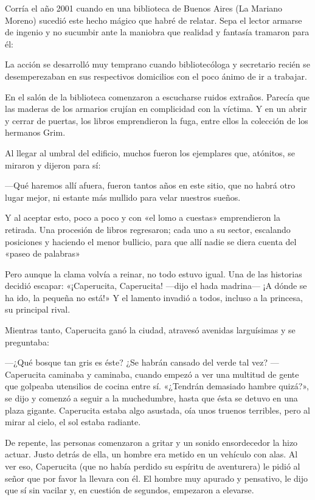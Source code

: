\documentclass[11pt,twoside,openright,a5paper]{book}
\begin{document}
Corría el año 2001 cuando en una biblioteca de Buenos Aires (La Mariano Moreno) sucedió este hecho mágico que habré de relatar. Sepa el lector armarse de ingenio y no sucumbir ante la maniobra que realidad y fantasía tramaron para él:

La acción se desarrolló muy temprano cuando bibliotecóloga y secretario recién se desemperezaban en sus respectivos domicilios con el poco ánimo de ir a trabajar.

En el salón de la biblioteca comenzaron a escucharse ruidos extraños. Parecía que las maderas de los armarios crujían  en complicidad con la víctima. Y en un abrir y cerrar de puertas, los libros emprendieron la fuga, entre ellos la colección de los hermanos Grim.

Al llegar al umbral del edificio, muchos fueron los ejemplares que, atónitos, se miraron y dijeron para sí: 

---Qué haremos allí afuera, fueron tantos años en este sitio, que no habrá otro lugar mejor, ni estante más mullido para velar nuestros sueños.

Y al aceptar esto, poco a poco y con «el lomo a cuestas» emprendieron la retirada. Una procesión de libros regresaron; cada uno a su sector, escalando posiciones y haciendo el menor bullicio, para que allí nadie se diera cuenta del «paseo de palabras» 

Pero aunque la clama volvía a reinar, no todo estuvo igual. Una de las historias decidió escapar: «¡Caperucita, Caperucita! ---dijo el hada madrina--- ¡A dónde se ha ido, la pequeña no está!» Y el lamento invadió a todos, incluso a la princesa, su principal rival.

Mientras tanto, Caperucita ganó la ciudad, atravesó avenidas larguísimas y se preguntaba:

---¿Qué bosque tan gris es éste? ¿Se habrán cansado del verde tal vez? ---Caperucita caminaba y caminaba, cuando empezó a ver una multitud de gente que golpeaba utensilios de cocina entre sí. «¿Tendrán demasiado hambre quizá?», se dijo y comenzó a seguir a la muchedumbre, hasta que ésta se detuvo en una plaza gigante. Caperucita estaba algo asustada, oía unos truenos terribles, pero al mirar al cielo, el sol estaba radiante.

De repente, las personas comenzaron a gritar y un sonido ensordecedor la hizo actuar. Justo detrás de ella, un hombre era metido en un vehículo con alas. Al ver eso, Caperucita (que no había perdido su espíritu de aventurera) le pidió al señor que por favor la llevara con él. El hombre muy apurado y pensativo, le dijo que sí sin vacilar y, en cuestión de segundos, empezaron a elevarse.
\end{document}

